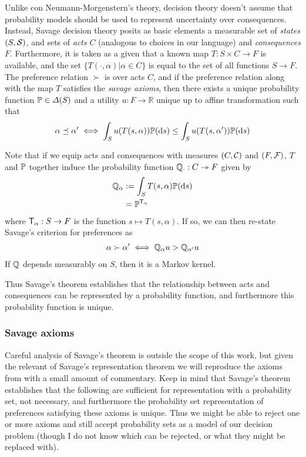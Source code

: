 Unlike con Neumann-Morgenstern's theory, \citet{savage_foundations_1954} decision theory doesn't assume that probability models should be used to represent uncertainty over consequences. Instead, Savage decision theory posits as basic elements a measurable set of \emph{states} $(S,\mathcal{S})$, and sets of \emph{acts} $C$ (analogous to choices in our language) and \emph{consequences} $F$. Furthermore, it is taken as a given that a known map $T:S\times C\to F$ is available, and the set $\{T(\cdot,\alpha)|\alpha\in C\}$ is equal to the set of all functions $S\to F$. The preference relation $\succ$ is over acts $C$, and if the preference relation along with the map $T$ satisfies the \emph{savage axioms}, then there exists a unique probability function $\mathbb{P}\in \Delta(S)$ and a utility $u:F\to \mathbb{R}$ unique up to affine transformation such that
\begin{align}
    \alpha\preceq \alpha' \iff \int_S u(T(s,\alpha))\mathbb{P}(\mathrm{d}s) \leq \int_S u(T(s,\alpha'))\mathbb{P}(\mathrm{d}s)
\end{align}

Note that if we equip acts and consequences with measures $(C,\mathcal{C})$ and $(F,\mathcal{F})$, $T$ and $\mathbb{P}$ together induce the probability function $\mathbb{Q}_\cdot:C\rightarrowtriangle F$ given by
\begin{align}
    \mathbb{Q}_\alpha &:= \int_S T(s,\alpha)\mathbb{P}(\mathrm{d}s)\\
                    &=\mathbb{P}^{\mathsf{T}_\alpha}
\end{align}
where $\mathsf{T}_\alpha:S\to F$ is the function $s\mapsto T(s,\alpha)$. If so, we can then re-state Savage's criterion for preferences as
\begin{align}
    \alpha\succ \alpha' \iff \mathbb{Q}_\alpha u > \mathbb{Q}_{\alpha'} u
\end{align}
 If $\mathbb{Q}$ depends measurably on $S$, then it is a Markov kernel.


Thus Savage's theorem establishes that the relationship between acts and consequences can be represented by a probability function, and furthermore this probability function is unique. 

\subsubsection{Savage axioms}

Careful analysis of Savage's theorem is outside the scope of this work, but given the relevant of Savage's representation theorem we will reproduce the axioms from \citet{savage_foundations_1954} with a small amount of commentary. Keep in mind that Savage's theorem establishes that the following are sufficient for representation with a probability set, not necessary, and furthermore the probability set representation of preferences satisfying these axioms is unique. Thus we might be able to reject one or more axioms and still accept probability sets as a model of our decision problem (though I do not know which can be rejected, or what they might be replaced with).

